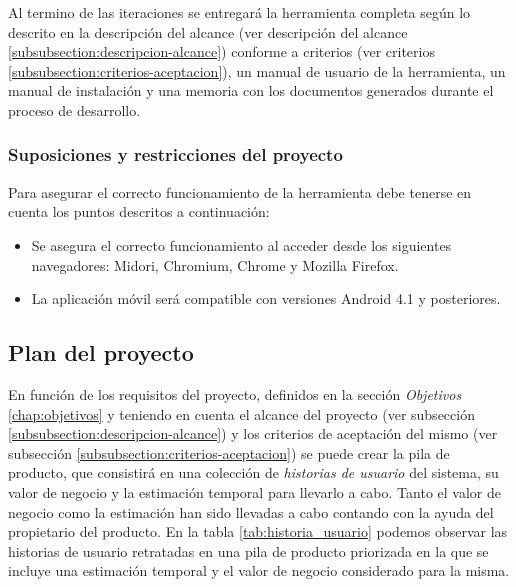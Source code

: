 	Al termino de las iteraciones se entregará la herramienta completa según lo descrito en la descripción del alcance (ver descripción del alcance \ref{subsubsection:descripcion-alcance}) conforme a criterios (ver criterios \ref{subsubsection:criterios-aceptacion}), un manual de usuario de la herramienta, un manual de instalación y una memoria con los documentos generados durante el proceso de desarrollo.
	
		\subsubsection{Suposiciones y restricciones del proyecto}
		Para asegurar el correcto funcionamiento de la herramienta debe tenerse en cuenta los puntos descritos a continuación:
		
		\begin{itemize}[label={$\bullet$},labelindent=\parindent,leftmargin=2cm]
			\item Se asegura el correcto funcionamiento al acceder desde los siguientes navegadores: Midori, Chromium, Chrome y Mozilla Firefox.
			\item La aplicación móvil será compatible con versiones Android 4.1 y posteriores.
		\end{itemize}

	\subsection{Plan del proyecto}
	En función de los requisitos del proyecto, definidos en la sección \textit{Objetivos} \ref{chap:objetivos} y teniendo en cuenta el alcance del proyecto (ver subsección \ref{subsubsection:descripcion-alcance}) y los criterios de aceptación del mismo (ver subsección \ref{subsubsection:criterios-aceptacion}) se puede crear la pila de producto, que consistirá en una colección de \textit{historias de usuario} del sistema, su valor de negocio y la estimación temporal para llevarlo a cabo. Tanto el valor de negocio como la estimación han sido llevadas a cabo contando con la ayuda del propietario del producto.
	En la tabla \ref{tab:historia_usuario} podemos observar las historias de usuario retratadas en una pila de producto priorizada en la que se incluye una estimación temporal y el valor de negocio considerado para la misma.


